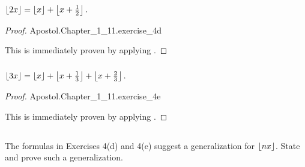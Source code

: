 \documentclass{report}
\begin{document}
\subsubsection{}%
\label{ssub:exercise-1.11.4d}

$\left\lfloor2x\right\rfloor = \left\lfloor x\right\rfloor + \left\lfloor x + \frac{1}{2}\right\rfloor.$

\begin{proof}

    {Apostol.Chapter\_1\_11.exercise\_4d}

  This is immediately proven by applying .

\end{proof}

\subsubsection{}%
\label{ssub:exercise-1.11.4e}

$\left\lfloor3x\right\rfloor = \left\lfloor x\right\rfloor + \left\lfloor x + \frac{1}{3}\right\rfloor + \left\lfloor x + \frac{2}{3}\right\rfloor.$

\begin{proof}

    {Apostol.Chapter\_1\_11.exercise\_4e}

  This is immediately proven by applying .

\end{proof}

\subsection{}%
\label{sub:hermites-identity}
\label{sub:exercise-1.11.5}

The formulas in Exercises 4(d) and 4(e) suggest a generalization for
  $\left\lfloor nx\right\rfloor$.
State and prove such a generalization.
\end{document}
